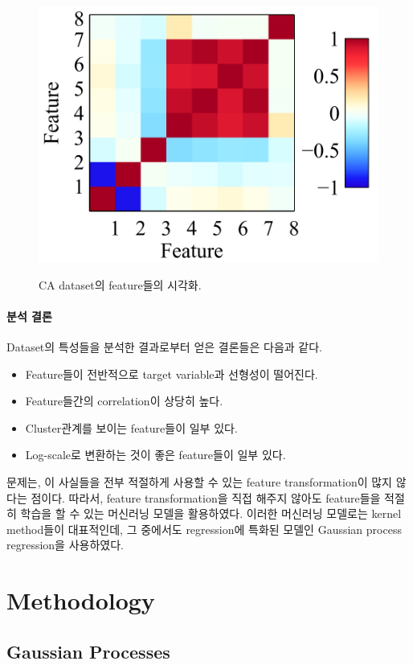 \documentclass[ba]{imsart}
\begin{document}
\begin{figure}
{    \includegraphics[scale=0.6]{figures/feature_viz_09.png}\label{fig:feqture_corr}
  }
  \caption{CA dataset의 feature들의 시각화.}\label{fig:feature}
\end{figure}

\paragraph{분석 결론}
Dataset의 특성들을 분석한 결과로부터 얻은 결론들은 다음과 같다.
\begin{itemize}
  \item Feature들이 전반적으로 target variable과 선형성이 떨어진다.
  \item Feature들간의 correlation이 상당히 높다.
  \item Cluster관계를 보이는 feature들이 일부 있다.
  \item Log-scale로 변환하는 것이 좋은 feature들이 일부 있다.
\end{itemize}
문제는, 이 사실들을 전부 적절하게 사용할 수 있는 feature transformation이 많지 않다는 점이다.
따라서, feature transformation을 직접 해주지 않아도 feature들을 적절히 학습을 할 수 있는 머신러닝 모델을 활용하였다.
이러한 머신러닝 모델로는 kernel method들이 대표적인데, 그 중에서도 regression에 특화된 모델인 Gaussian process regression을 사용하였다.


\section{Methodology}\label{section:method}
\subsection{Gaussian Processes}\label{section:gp}
\end{document}

